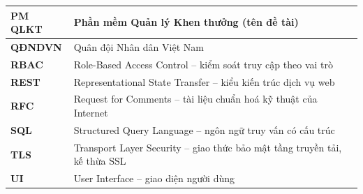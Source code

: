 \documentclass[../DoAn.tex]{subfiles}
\begin{document}
\begin{longtable}{|>{\centering\arraybackslash}p{3.2cm}|p{10.8cm}|}
\textbf{PM QLKT}  & Phần mềm Quản lý Khen thưởng (tên đề tài) \\ \hline
\textbf{QĐNDVN}   & Quân đội Nhân dân Việt Nam \\ \hline
\textbf{RBAC}     & Role-Based Access Control -- kiểm soát truy cập theo vai trò \\ \hline
\textbf{REST}     & Representational State Transfer -- kiểu kiến trúc dịch vụ web \\ \hline
\textbf{RFC}      & Request for Comments -- tài liệu chuẩn hoá kỹ thuật của Internet \\ \hline
\textbf{SQL}      & Structured Query Language -- ngôn ngữ truy vấn có cấu trúc \\ \hline
\textbf{TLS}      & Transport Layer Security -- giao thức bảo mật tầng truyền tải, kế thừa SSL \\ \hline
\textbf{UI}       & User Interface -- giao diện người dùng \\ \hline
\end{longtable}
\end{document}
